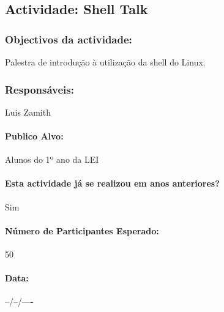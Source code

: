\subsection{Actividade: Shell Talk} %

\subsubsection*{Objectivos da actividade:}
Palestra de introdução à utilização da shell do Linux.

\subsubsection*{Responsáveis:}
\begin{itemizedash}
	\item{Luis Zamith}
\end{itemizedash}

\paragraph{Publico Alvo: }
Alunos do 1º ano da LEI

\paragraph{Esta actividade já se realizou em anos anteriores?}
Sim

\paragraph{Número de Participantes Esperado:}
50

\paragraph{Data:} --/--/----

\vspace{20pt}
